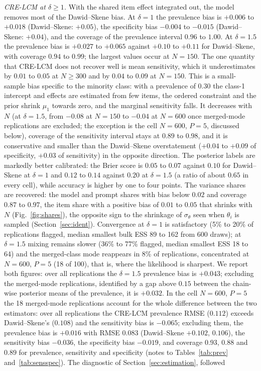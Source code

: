 \emph{CRE-LCM at $\delta \ge 1$.} With the shared item effect integrated out, the model
removes most of the Dawid--Skene bias. At $\delta = 1$ the prevalence bias is $+0.006$ to
$+0.018$ (Dawid--Skene: $+0.05$), the specificity bias $-0.004$ to $-0.015$
(Dawid--Skene: $+0.04$), and the coverage of the prevalence interval $0.96$ to $1.00$.
At $\delta = 1.5$ the prevalence bias is $+0.027$ to $+0.065$ against $+0.10$ to $+0.11$
for Dawid--Skene, with coverage $0.94$ to $0.99$; the largest values occur at $N = 150$.
The one quantity that CRE-LCM does not recover well is mean sensitivity, which it
underestimates by $0.01$ to $0.05$ at $N \ge 300$ and by $0.04$ to $0.09$ at $N = 150$.
This is a small-sample bias specific to the minority class: with a prevalence of $0.30$
the class-1 intercept and effects are estimated from few items, the ordered constraint
and the prior shrink $\mu_1$ towards zero, and the marginal sensitivity falls. It decreases with $N$ (at $\delta = 1.5$, from $-0.08$ at $N = 150$ to $-0.04$ at $N = 600$ once merged-mode replications are excluded; the exception is the cell $N = 600$, $P = 5$, discussed below), coverage of the sensitivity interval stays at $0.89$ to $0.98$, and it is
conservative and smaller than the Dawid--Skene overstatement ($+0.04$ to $+0.09$ of
specificity, $+0.03$ of sensitivity) in the opposite direction. The posterior labels are markedly better calibrated: the
Brier score is $0.05$ to $0.07$ against $0.10$ for Dawid--Skene at $\delta = 1$ and
$0.12$ to $0.14$ against $0.20$ at $\delta = 1.5$ (a ratio of about $0.65$ in every
cell), while accuracy is higher by one to four points. The variance shares are recovered:
the model and prompt shares with bias below $0.02$ and coverage $0.87$ to $0.97$, the item
share with a positive bias of $0.01$ to $0.05$ that shrinks with $N$ (Fig.~\ref{fig:shares}),
the opposite sign to the shrinkage of $\sigma_\theta$ seen when $\theta_i$ is sampled
(Section~\ref{sec:ident}). Convergence at $\delta = 1$ is satisfactory (5\% to 20\% of
replications flagged, median smallest bulk ESS 89 to 162 from 600 draws); at $\delta = 1.5$
mixing remains slower (36\% to 77\% flagged, median smallest ESS 18 to 64) and the
merged-class mode reappears in 8\% of replications, concentrated at $N = 600$, $P = 5$ (18
of 100), that is, where the likelihood is sharpest. We report both figures: over all replications the $\delta = 1.5$ prevalence bias is $+0.043$; excluding the merged-mode replications, identified by a gap above $0.15$ between the chain-wise posterior means of the prevalence, it is $+0.032$. In the cell $N = 600$, $P = 5$ the 18 merged-mode replications account for the whole difference between the two estimators: over all replications the CRE-LCM prevalence RMSE ($0.112$) exceeds Dawid--Skene's ($0.108$) and the sensitivity bias is $-0.065$; excluding them, the prevalence bias is $+0.016$ with RMSE $0.083$ (Dawid--Skene $+0.102$, $0.106$), the sensitivity bias $-0.036$, the specificity bias $-0.019$, and coverage $0.93$, $0.88$ and $0.89$ for prevalence, sensitivity and specificity (notes to Tables~\ref{tab:prev} and~\ref{tab:sensspec}). The diagnostic of Section~\ref{sec:estimation}, followed
